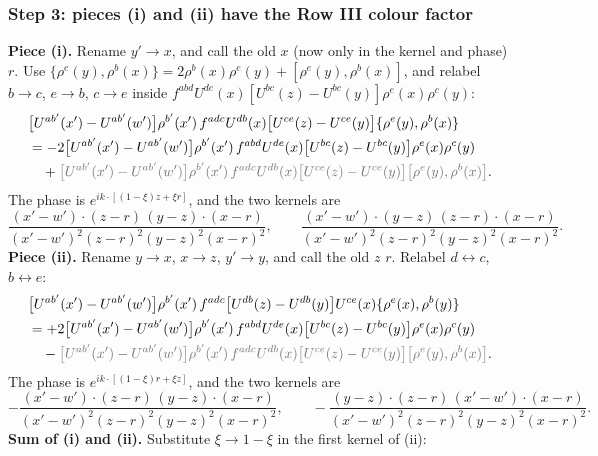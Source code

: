 \documentclass[9pt]{article}
\newcommand{\Gr}[1]{{\color{cX}#1}}
\numberwithin{equation}{section}
\begin{document}
\subsubsection*{Step 3: pieces (i) and (ii) have the Row III colour factor}
\textbf{Piece (i).} Rename $y'\to x$, and call the old $x$ (now only in the kernel and phase) $r$. Use $\{\rho^{e}(y),\rho^{b}(x)\}=2\rho^{b}(x)\rho^{e}(y)+[\rho^{e}(y),\rho^{b}(x)]$, and relabel $b\to c$, $e\to b$, $c\to e$ inside $f^{abd}U^{de}(x)[U^{bc}(z)-U^{bc}(y)]\rho^{e}(x)\rho^{c}(y)$:
\begin{align}
&\big[U^{ab'}(x')-U^{ab'}(w')\big]\rho^{b'}(x')\,f^{adc}U^{db}(x)\big[U^{ce}(z)-U^{ce}(y)\big]\{\rho^{e}(y),\rho^{b}(x)\}\notag\\
&=-2\big[U^{ab'}(x')-U^{ab'}(w')\big]\rho^{b'}(x')\,f^{abd}U^{de}(x)\big[U^{bc}(z)-U^{bc}(y)\big]\rho^{e}(x)\rho^{c}(y)\notag\\
&\quad+\Gr{\big[U^{ab'}(x')-U^{ab'}(w')\big]\rho^{b'}(x')\,f^{adc}U^{db}(x)\big[U^{ce}(z)-U^{ce}(y)\big]\big[\rho^{e}(y),\rho^{b}(x)\big]}.
\end{align}
The phase is $e^{ik\cdot[(1-\xi)z+\xi r]}$, and the two kernels are
\begin{equation}
\frac{(x'-w')\cdot(z-r)\,(y-z)\cdot(x-r)}{(x'-w')^{2}(z-r)^{2}(y-z)^{2}(x-r)^{2}},\qquad\frac{(x'-w')\cdot(y-z)\,(z-r)\cdot(x-r)}{(x'-w')^{2}(z-r)^{2}(y-z)^{2}(x-r)^{2}}.
\end{equation}
\textbf{Piece (ii).} Rename $y\to x$, $x\to z$, $y'\to y$, and call the old $z$ $r$. Relabel $d\leftrightarrow c$, $b\leftrightarrow e$:
\begin{align}
&\big[U^{ab'}(x')-U^{ab'}(w')\big]\rho^{b'}(x')\,f^{adc}\big[U^{db}(z)-U^{db}(y)\big]U^{ce}(x)\{\rho^{e}(x),\rho^{b}(y)\}\notag\\
&=+2\big[U^{ab'}(x')-U^{ab'}(w')\big]\rho^{b'}(x')\,f^{abd}U^{de}(x)\big[U^{bc}(z)-U^{bc}(y)\big]\rho^{e}(x)\rho^{c}(y)\notag\\
&\quad-\Gr{\big[U^{ab'}(x')-U^{ab'}(w')\big]\rho^{b'}(x')\,f^{adc}U^{db}(x)\big[U^{ce}(z)-U^{ce}(y)\big]\big[\rho^{e}(y),\rho^{b}(x)\big]}.
\end{align}
The phase is $e^{ik\cdot[(1-\xi)r+\xi z]}$, and the two kernels are
\begin{equation}
-\frac{(x'-w')\cdot(z-r)\,(y-z)\cdot(x-r)}{(x'-w')^{2}(z-r)^{2}(y-z)^{2}(x-r)^{2}},\qquad-\frac{(y-z)\cdot(z-r)\,(x'-w')\cdot(x-r)}{(x'-w')^{2}(z-r)^{2}(y-z)^{2}(x-r)^{2}}.
\end{equation}
\textbf{Sum of (i) and (ii).} Substitute $\xi\to1-\xi$ in the first kernel of (ii):
\end{document}
